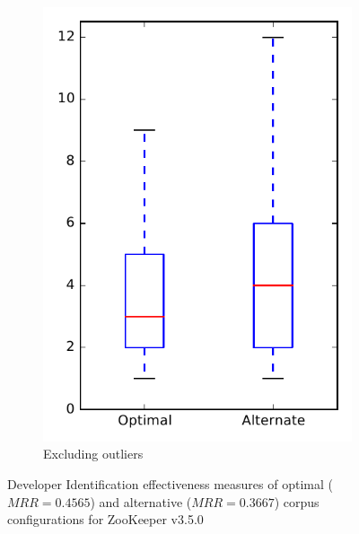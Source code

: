 \begin{figure}
\begin{subfigure}{.4\textwidth}
        \includegraphics[height=0.4\textheight]{figures/combo/dit_rq2_zookeeper_no_outlier}
        \caption{Excluding outliers}\label{fig:combo:dit:rq2:zookeeper_no_outlier}
    \end{subfigure}
\caption{Developer Identification effectiveness measures of optimal ($MRR=0.4565$) and alternative ($MRR=0.3667$) corpus configurations for ZooKeeper v3.5.0}
\label{fig:combo:dit:rq2:zookeeper}
\end{figure}
